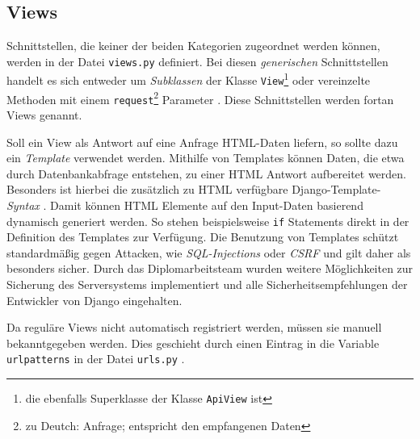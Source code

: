 \hypertarget{views}{%
\subsection{Views}\label{views}}

Schnittstellen, die keiner der beiden \oa{} Kategorien zugeordnet werden
können, werden in der Datei \texttt{views.py} definiert. Bei diesen
\emph{generischen}
Schnittstellen handelt es sich entweder um
\emph{Subklassen}
der Klasse \texttt{View}\footnote{die ebenfalls Superklasse der Klasse
  \texttt{ApiView} ist} \cite{django-doku-class-based-views} oder
vereinzelte Methoden mit einem \texttt{request}\footnote{zu Deutch:
  Anfrage; entspricht den empfangenen Daten} Parameter
\cite{django-doku-views}. Diese Schnittstellen werden fortan Views
genannt.

Soll ein View als Antwort auf eine Anfrage HTML-Daten liefern, so sollte
dazu ein \emph{Template}
verwendet werden. Mithilfe von Templates können Daten, die etwa durch
Datenbankabfrage entstehen, zu einer HTML Antwort aufbereitet werden.
Besonders ist hierbei die zusätzlich zu HTML verfügbare
Django-Template-\emph{Syntax}
\cite{django-doku-template}. Damit können HTML Elemente auf den
Input-Daten basierend dynamisch generiert werden. So stehen
beispielsweise \texttt{if} Statements direkt in der Definition des
Templates zur Verfügung. Die Benutzung von Templates schützt
standardmäßig gegen Attacken, wie
\emph{SQL-Injections}
oder \emph{CSRF}
\cite{csrf}
und gilt daher als besonders sicher. Durch das Diplomarbeitsteam wurden
weitere Möglichkeiten zur Sicherung des Serversystems
\cite{django-doku-security} implementiert und alle
Sicherheitsempfehlungen der Entwickler von Django
\cite{django-doku-security} eingehalten.

Da reguläre Views nicht automatisch registriert werden, müssen sie
manuell bekanntgegeben werden. Dies geschieht durch einen Eintrag in die
Variable \texttt{urlpatterns} in der Datei \texttt{urls.py}
\cite{django-doku-urls}.

